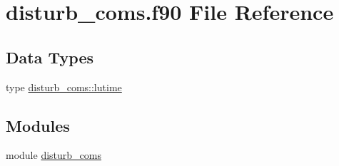 \hypertarget{disturb__coms_8f90}{}\section{disturb\+\_\+coms.\+f90 File Reference}
\label{disturb__coms_8f90}
\subsection*{Data Types}
\begin{DoxyCompactItemize}
\item 
type \hyperlink{structdisturb__coms_1_1lutime}{disturb\+\_\+coms\+::lutime}
\end{DoxyCompactItemize}
\subsection*{Modules}
\begin{DoxyCompactItemize}
\item 
module \hyperlink{namespacedisturb__coms}{disturb\+\_\+coms}
\end{DoxyCompactItemize}
